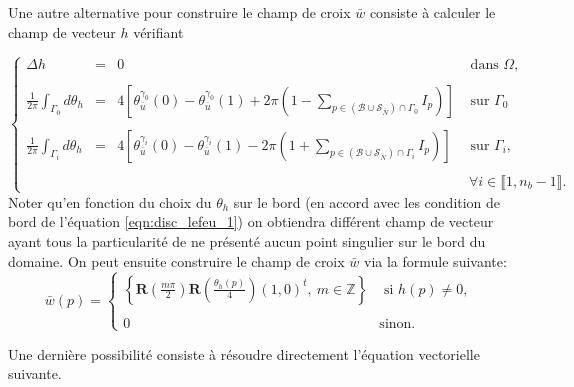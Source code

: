 Une autre alternative pour construire le champ de croix $\bar{w}$ consiste à calculer le champ de vecteur $h$ vérifiant

\begin{equation}
\left\{
\begin{array}{lcll}
    \Delta h &=& 0 & \mbox{ dans }\Omega,\\\\
    \displaystyle\frac{1}{2\pi}\displaystyle\int_{\Gamma_0}d\theta_{h} &=&4\left[\theta_{\bar{u}}^{\gamma_0}(0)-\theta_{\bar{u}}^{\gamma_0}(1)+2\pi\left(1-\displaystyle\sum_{p\in(\mathcal{B}\cup\mathcal{S}_{\bar{N}})\cap\Gamma_0}I_p\right)\right]&\mbox{ sur }\Gamma_0\\\\
    \displaystyle\frac{1}{2\pi}\displaystyle\int_{\Gamma_i}d\theta_{h} &=& 4\left[\theta_{\bar{u}}^{\gamma_i}(0)-\theta_{\bar{u}}^{\gamma_i}(1)-2\pi\left(1+\displaystyle\sum_{p\in(\mathcal{B}\cup\mathcal{S}_{\bar{N}})\cap\Gamma_i}I_p\right)\right]&\mbox{ sur }\Gamma_i,\\\\
    &&&~\forall i\in\llbracket 1, n_b-1\rrbracket.
\end{array}
\right.
\label{eqn:disc_lefeu_1}
\end{equation}
Noter qu'en fonction du choix du $\theta_h$ sur le bord (en accord avec les condition de bord de l'équation \ref{eqn:disc_lefeu_1}) on obtiendra différent champ de vecteur ayant tous la particularité de ne présenté aucun point singulier sur le bord du domaine. On peut ensuite construire le champ de croix $\bar{w}$ via la formule suivante:
\begin{equation}
    \bar{w}(p) =
\left\{
    \begin{array}{ll}
        \displaystyle\left\{\mathbf{R}\left(\frac{m\pi}{2}\right)\mathbf{R}\left(\frac{\theta_h(p)}{4}\right)(1, 0)^t,~ m\in \mathbb{Z}\right\} &\text{ si }h(p)\neq 0,\\\\
        0& \text{sinon}.
    \end{array}
\right.
\label{eqn:disc_repr_to_cross}
\end{equation}

Une dernière possibilité consiste à résoudre directement l'équation vectorielle suivante.

